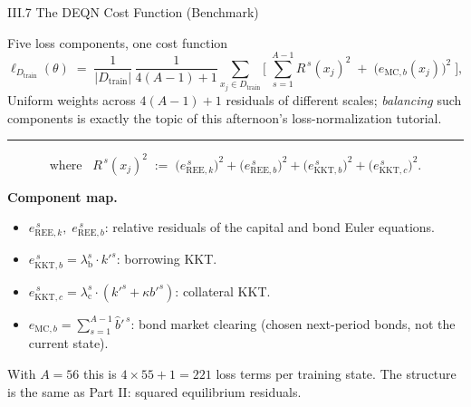 \documentclass[aspectratio=169,11pt]{beamer}
\newcommand{\emphc}[1]{\textcolor{harvardcrimson}{#1}}
\newcommand{\Loss}{\ell}
\begin{document}
\begin{frame}{III.7 The DEQN Cost Function (Benchmark)}
\footnotesize
\begin{block}{Five loss components, one cost function}
\vspace{-2pt}
\[
\Loss_{D_{\text{train}}}(\theta) \;=\; \frac{1}{|D_{\text{train}}|}\,\frac{1}{4(A-1)+1}\!
\sum_{x_j \in D_{\text{train}}}\!\Biggl[\;\sum_{s=1}^{A-1} R^{\,s}(x_j)^2 \;+\; \bigl(e_{\text{MC},b}(x_j)\bigr)^2\;\Biggr],
\]
{\scriptsize Uniform weights across $4(A-1)+1$ residuals of different scales; \emph{balancing} such components is exactly the topic of this afternoon's loss-normalization tutorial.}

\vspace{4pt}
\hrule
\vspace{4pt}
\[
\text{where}\;\;\;R^{\,s}(x_j)^2 \;:=\; \bigl(e_{\text{REE},k}^{\,s}\bigr)^2 + \bigl(e_{\text{REE},b}^{\,s}\bigr)^2 + \bigl(e_{\text{KKT},b}^{\,s}\bigr)^2 + \bigl(e_{\text{KKT},c}^{\,s}\bigr)^2.
\]
\vspace{-4pt}
\end{block}

\vspace{-2pt}
\textbf{Component map.}
\begin{itemize}\itemsep0pt
    \item $e_{\text{REE},k}^{\,s},\;e_{\text{REE},b}^{\,s}$: relative residuals of the capital and bond Euler equations.
    \item $e_{\text{KKT},b}^{\,s} = \lambda_{\text{b}}^s \cdot k'^s$: borrowing KKT.
    \item $e_{\text{KKT},c}^{\,s} = \lambda_{\text{c}}^s \cdot (k'^s + \kappa b'^s)$: collateral KKT.
    \item $e_{\text{MC},b} = \sum_{s=1}^{A-1} \hat b'^{\,s}$: bond market clearing (\emphc{chosen} next-period bonds, not the current state).
\end{itemize}

\vspace{0.2em}
{\scriptsize With $A = 56$ this is \emphc{$4 \times 55 + 1 = 221$} loss terms per training state.  The structure is the same as Part II: squared equilibrium residuals.}
\end{frame}
\end{document}
